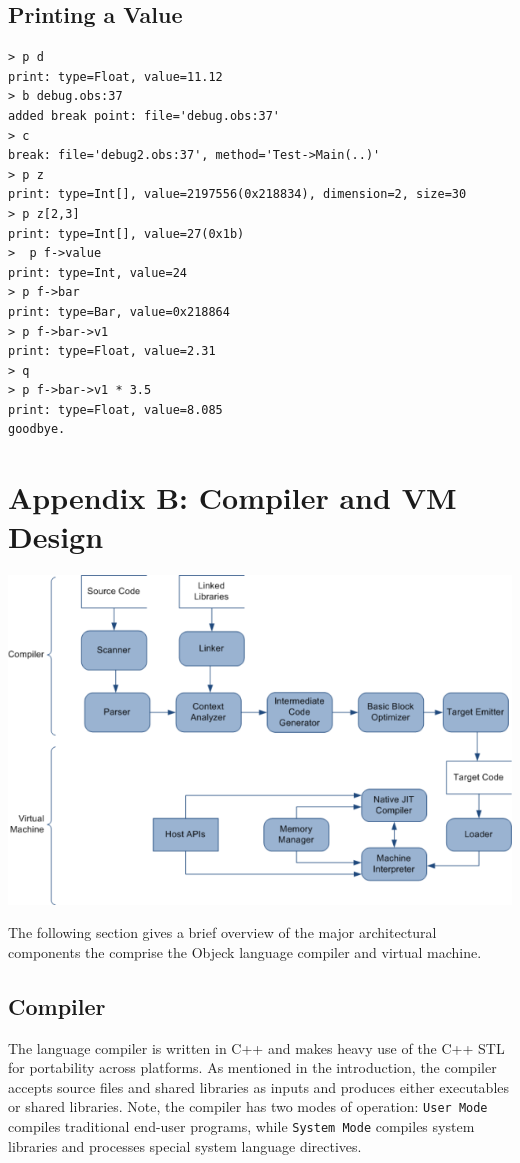 \documentclass[12pt]{article}
\begin{document}
\subsection{Printing a Value}
\begin{verbatim}
> p d
print: type=Float, value=11.12
> b debug.obs:37
added break point: file='debug.obs:37'
> c
break: file='debug2.obs:37', method='Test->Main(..)'
> p z
print: type=Int[], value=2197556(0x218834), dimension=2, size=30
> p z[2,3]
print: type=Int[], value=27(0x1b)
>  p f->value
print: type=Int, value=24
> p f->bar
print: type=Bar, value=0x218864
> p f->bar->v1
print: type=Float, value=2.31
> q
> p f->bar->v1 * 3.5
print: type=Float, value=8.085
goodbye.
\end{verbatim}

\section{Appendix B: Compiler and VM Design}
\includegraphics[scale=0.60]{../../images/compiler_data_flow.png}

The following section gives a brief overview of the major architectural components the comprise the Objeck language compiler and virtual machine.

\subsection{Compiler}
The language compiler is written in C++ and makes heavy use of the C++ STL for portability across platforms.  As mentioned in the introduction, the compiler accepts source files and shared libraries as inputs and produces either executables or shared libraries.  Note, the compiler has two modes of operation: \texttt{User Mode} compiles traditional end-user programs, while \texttt{System Mode} compiles system libraries and processes special system language directives.
\end{document}
